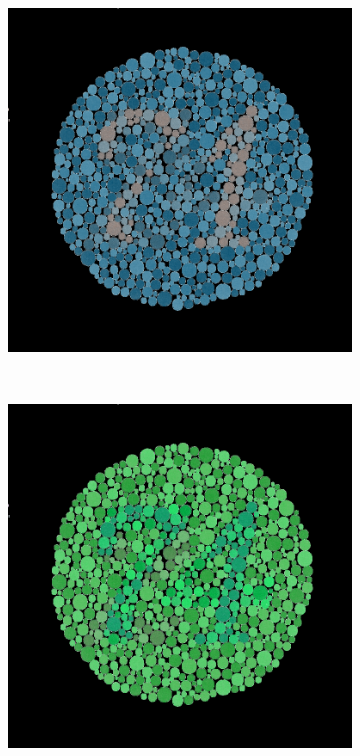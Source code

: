 \documentclass{sig-alternate-05-2015}
\begin{document}
\begin{figure}
\begin{subfigure}[t]{0.5\columnwidth}
        \includegraphics[width=\textwidth]{74_tritanope_zero.png}
    \end{subfigure}
    \\
    \begin{subfigure}[t]{0.5\columnwidth}
        \includegraphics[width=\textwidth]{74_protanope.png}

\end{subfigure}
\end{figure}
\end{document}
